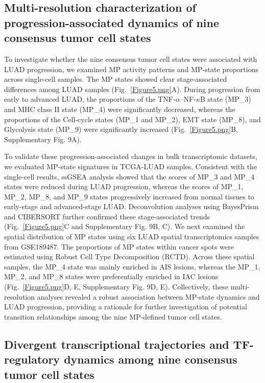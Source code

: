 \documentclass[pdflatex,sn-mathphys-num]{sn-jnl}%
\theoremstyle{thmstyleone}%
\theoremstyle{thmstyletwo}%
\theoremstyle{thmstylethree}%
\begin{document}
\subsection{Multi-resolution characterization of progression-associated dynamics of nine consensus tumor cell states}\label{subsec5}

To investigate whether the nine consensus tumor cell states were associated with LUAD progression, we examined MP activity patterns and MP-state proportions across single-cell samples. The MP states showed clear stage-associated differences among LUAD samples (Fig.~\ref{Figure5.png}A). During progression from early to advanced LUAD, the proportions of the TNF-\(\alpha\)--NF-\(\kappa\)B state (MP\_3) and MHC class II state (MP\_4) were significantly decreased, whereas the proportions of the Cell-cycle states (MP\_1 and MP\_2), EMT state (MP\_8), and Glycolysis state (MP\_9) were significantly increased (Fig.~\ref{Figure5.png}B, Supplementary Fig. 9A).

To validate these progression-associated changes in bulk transcriptomic datasets, we evaluated MP-state signatures in TCGA-LUAD samples. Consistent with the single-cell results, ssGSEA analysis showed that the scores of MP\_3 and MP\_4 states were reduced during LUAD progression, whereas the scores of MP\_1, MP\_2, MP\_8, and MP\_9 states progressively increased from normal tissues to early-stage and advanced-stage LUAD. Deconvolution analyses using BayesPrism and CIBERSORT further confirmed these stage-associated trends (Fig.~\ref{Figure5.png}C and Supplementary Fig. 9B, C).
We next examined the spatial distribution of MP states using six LUAD spatial transcriptomics samples from GSE189487. The proportions of MP states within cancer spots were estimated using Robust Cell Type Decomposition (RCTD). Across these spatial samples, the MP\_4 state was mainly enriched in AIS lesions, whereas the MP\_1, MP\_2, and MP\_8 states were preferentially enriched in IAC lesions (Fig.~\ref{Figure5.png}D, E, Supplementary Fig. 9D, E). Collectively, these multi-resolution analyses revealed a robust association between MP-state dynamics and LUAD progression, providing a rationale for further investigation of potential transition relationships among the nine MP-defined tumor cell states.

\subsection{Divergent transcriptional trajectories and TF-regulatory dynamics among nine consensus tumor cell states}\label{subsec6}
\end{document}
